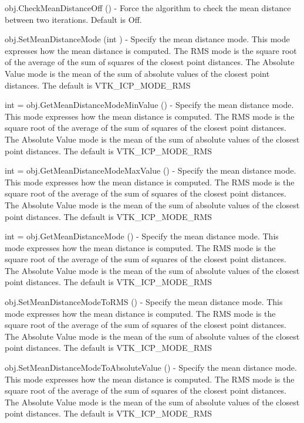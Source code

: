 \begin{DoxyItemize}
\item {\ttfamily obj.\-Check\-Mean\-Distance\-Off ()} -\/ Force the algorithm to check the mean distance between two iterations. Default is Off.  
\item {\ttfamily obj.\-Set\-Mean\-Distance\-Mode (int )} -\/ Specify the mean distance mode. This mode expresses how the mean distance is computed. The R\-M\-S mode is the square root of the average of the sum of squares of the closest point distances. The Absolute Value mode is the mean of the sum of absolute values of the closest point distances. The default is V\-T\-K\-\_\-\-I\-C\-P\-\_\-\-M\-O\-D\-E\-\_\-\-R\-M\-S  
\item {\ttfamily int = obj.\-Get\-Mean\-Distance\-Mode\-Min\-Value ()} -\/ Specify the mean distance mode. This mode expresses how the mean distance is computed. The R\-M\-S mode is the square root of the average of the sum of squares of the closest point distances. The Absolute Value mode is the mean of the sum of absolute values of the closest point distances. The default is V\-T\-K\-\_\-\-I\-C\-P\-\_\-\-M\-O\-D\-E\-\_\-\-R\-M\-S  
\item {\ttfamily int = obj.\-Get\-Mean\-Distance\-Mode\-Max\-Value ()} -\/ Specify the mean distance mode. This mode expresses how the mean distance is computed. The R\-M\-S mode is the square root of the average of the sum of squares of the closest point distances. The Absolute Value mode is the mean of the sum of absolute values of the closest point distances. The default is V\-T\-K\-\_\-\-I\-C\-P\-\_\-\-M\-O\-D\-E\-\_\-\-R\-M\-S  
\item {\ttfamily int = obj.\-Get\-Mean\-Distance\-Mode ()} -\/ Specify the mean distance mode. This mode expresses how the mean distance is computed. The R\-M\-S mode is the square root of the average of the sum of squares of the closest point distances. The Absolute Value mode is the mean of the sum of absolute values of the closest point distances. The default is V\-T\-K\-\_\-\-I\-C\-P\-\_\-\-M\-O\-D\-E\-\_\-\-R\-M\-S  
\item {\ttfamily obj.\-Set\-Mean\-Distance\-Mode\-To\-R\-M\-S ()} -\/ Specify the mean distance mode. This mode expresses how the mean distance is computed. The R\-M\-S mode is the square root of the average of the sum of squares of the closest point distances. The Absolute Value mode is the mean of the sum of absolute values of the closest point distances. The default is V\-T\-K\-\_\-\-I\-C\-P\-\_\-\-M\-O\-D\-E\-\_\-\-R\-M\-S  
\item {\ttfamily obj.\-Set\-Mean\-Distance\-Mode\-To\-Absolute\-Value ()} -\/ Specify the mean distance mode. This mode expresses how the mean distance is computed. The R\-M\-S mode is the square root of the average of the sum of squares of the closest point distances. The Absolute Value mode is the mean of the sum of absolute values of the closest point distances. The default is V\-T\-K\-\_\-\-I\-C\-P\-\_\-\-M\-O\-D\-E\-\_\-\-R\-M\-S  

\end{DoxyItemize}
